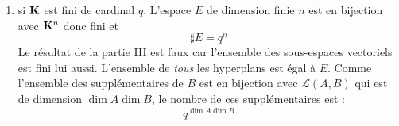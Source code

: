 \begin{enumerate}
\item si $\mathbf{K}$ est fini de cardinal $q$. L'espace $E$ de dimension finie $n$ est en bijection avec $\mathbf{K}^n$ donc fini et
\begin{displaymath}
 \sharp E = q^n
\end{displaymath}
Le résultat de la partie III est faux car l'ensemble des sous-espaces vectoriels est fini lui aussi. L'ensemble de \emph{tous} les hyperplans est égal à $E$.\newline
Comme l'ensemble des supplémentaires de $B$ est en bijection avec $\mathcal L(A,B)$ qui est de dimension $\dim A \dim B$, le nombre de ces supplémentaires est :
\begin{displaymath}
 q^{\dim A \dim B}
\end{displaymath}
 
\end{enumerate}

